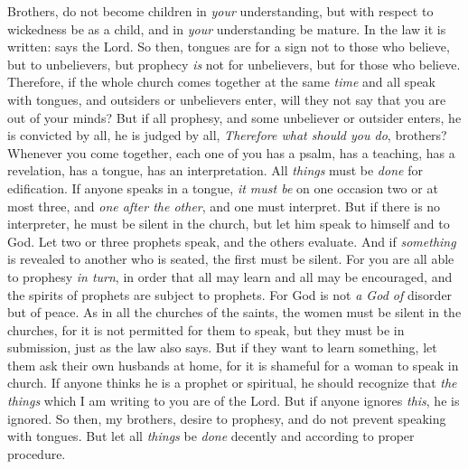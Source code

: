 \begin{biblechapter}
\verse Brothers, do not become children in \textit{your} understanding, but with respect to wickedness be as a child, and in \textit{your} understanding be mature.
\verse In the law it is written:
\verse says the Lord.
\verse So then, tongues are for a sign not to those who believe, but to unbelievers, but prophecy \textit{is} not for unbelievers, but for those who believe.
\verse Therefore, if the whole church comes together at the same \textit{time} and all speak with tongues, and outsiders or unbelievers enter, will they not say that you are out of your minds?
\verse But if all prophesy, and some unbeliever or outsider enters, he is convicted by all, he is judged by all,
 \textit{Therefore what should you do}, brothers? Whenever you come together, each one of you has a psalm, has a teaching, has a revelation, has a tongue, has an interpretation. All \textit{things} must be \textit{done} for edification.
\verse If anyone speaks in a tongue, \textit{it must be} on one occasion two or at most three, and \textit{one after the other}, and one must interpret.
\verse But if there is no interpreter, he must be silent in the church, but let him speak to himself and to God.
\verse Let two or three prophets speak, and the others evaluate.
\verse And if \textit{something} is revealed to another who is seated, the first must be silent.
\verse For you are all able to prophesy \textit{in turn}, in order that all may learn and all may be encouraged,
\verse and the spirits of prophets are subject to prophets.
\verse For God is not \textit{a God of} disorder but of peace.
\verse As in all the churches of the saints,
\verse the women must be silent in the churches, for it is not permitted for them to speak, but they must be in submission, just as the law also says.
\verse But if they want to learn something, let them ask their own husbands at home, for it is shameful for a woman to speak in church.
\verse If anyone thinks he is a prophet or spiritual, he should recognize that \textit{the things} which I am writing to you are of the Lord.
\verse But if anyone ignores \textit{this}, he is ignored.
\verse So then, my brothers, desire to prophesy, and do not prevent speaking with tongues.
\verse But let all \textit{things} be \textit{done} decently and according to proper procedure.
\end{biblechapter}

